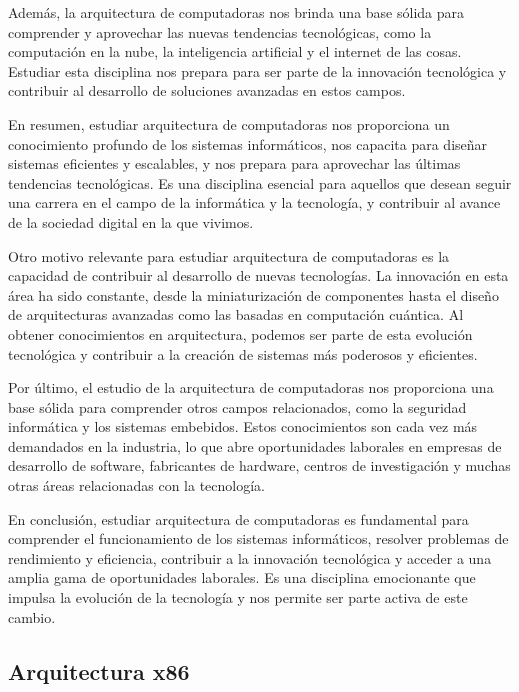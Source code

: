 \documentclass[12pt,twoside]{templates/unerthesis}
\begin{document}
Además, la arquitectura de computadoras nos brinda una base sólida para comprender y aprovechar las nuevas tendencias tecnológicas, como la computación en la nube, la inteligencia artificial y el internet de las cosas. Estudiar esta disciplina nos prepara para ser parte de la innovación tecnológica y contribuir al desarrollo de soluciones avanzadas en estos campos.

En resumen, estudiar arquitectura de computadoras nos proporciona un conocimiento profundo de los sistemas informáticos, nos capacita para diseñar sistemas eficientes y escalables, y nos prepara para aprovechar las últimas tendencias tecnológicas. Es una disciplina esencial para aquellos que desean seguir una carrera en el campo de la informática y la tecnología, y contribuir al avance de la sociedad digital en la que vivimos.

Otro motivo relevante para estudiar arquitectura de computadoras es la capacidad de contribuir al desarrollo de nuevas tecnologías. La innovación en esta área ha sido constante, desde la miniaturización de componentes hasta el diseño de arquitecturas avanzadas como las basadas en computación cuántica. Al obtener conocimientos en arquitectura, podemos ser parte de esta evolución tecnológica y contribuir a la creación de sistemas más poderosos y eficientes.

Por último, el estudio de la arquitectura de computadoras nos proporciona una base sólida para comprender otros campos relacionados, como la seguridad informática y los sistemas embebidos. Estos conocimientos son cada vez más demandados en la industria, lo que abre oportunidades laborales en empresas de desarrollo de software, fabricantes de hardware, centros de investigación y muchas otras áreas relacionadas con la tecnología.

En conclusión, estudiar arquitectura de computadoras es fundamental para comprender el funcionamiento de los sistemas informáticos, resolver problemas de rendimiento y eficiencia, contribuir a la innovación tecnológica y acceder a una amplia gama de oportunidades laborales. Es una disciplina emocionante que impulsa la evolución de la tecnología y nos permite ser parte activa de este cambio.

\hypertarget{arquitectura-x86}{%
\subsection{Arquitectura x86}\label{arquitectura-x86}}
\end{document}
